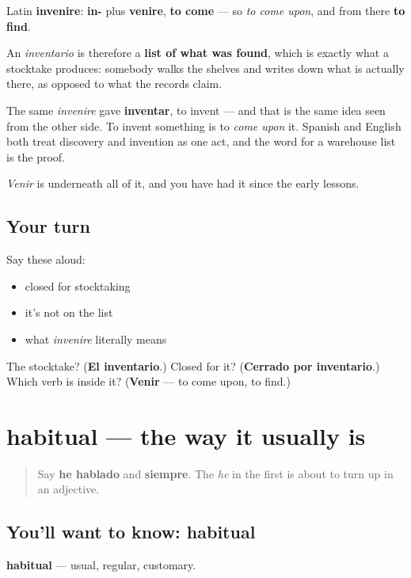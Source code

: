 \begin{cousinweb}
Latin \textbf{invenire}: \textbf{in-} plus \textbf{venire}, \textbf{to come} — so \emph{to come upon}, and from there \textbf{to find}.

An \emph{inventario} is therefore a \textbf{list of what was found}, which is exactly what a stocktake produces: somebody walks the shelves and writes down what is actually there, as opposed to what the records claim.

The same \emph{invenire} gave \textbf{inventar}, to invent — and that is the same idea seen from the other side. To invent something is to \emph{come upon} it. Spanish and English both treat discovery and invention as one act, and the word for a warehouse list is the proof.

\emph{Venir} is underneath all of it, and you have had it since the early lessons.
\end{cousinweb}

\subsection*{Your turn}
Say these aloud:

\begin{itemize}
\raggedright
  \item closed for stocktaking
  \item it's not on the list
  \item what \emph{invenire} literally means
\end{itemize}

\begin{tcolorbox}[breakable,colback=teal!4,colframe=teal!35!black,title={Before you move on}]
The stocktake? (\textbf{El inventario}.) Closed for it? (\textbf{Cerrado por inventario}.) Which verb is inside it? (\textbf{Venir} — to come upon, to find.)
\end{tcolorbox}
\section[habitual]{habitual — the way it usually is}

\label{lesson:ES-C459-habitual}



\begin{quote}
Say \textbf{he hablado} and \textbf{siempre}. The \emph{he} in the first is about to turn up in an adjective.
\end{quote}

\subsection*{You'll want to know: habitual}
\textbf{habitual} — usual, regular, customary.

